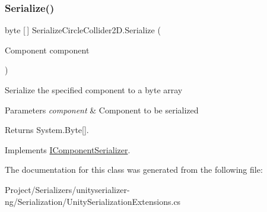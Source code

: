 \subsubsection{\texorpdfstring{Serialize()}{Serialize()}}
{\footnotesize\ttfamily byte \mbox{[}$\,$\mbox{]} Serialize\+Circle\+Collider2\+D.\+Serialize (\begin{DoxyParamCaption}\item[{Component}]{component }\end{DoxyParamCaption})\hspace{0.3cm}{\ttfamily [inline]}}



Serialize the specified component to a byte array 


\begin{DoxyParams}{Parameters}
{\em component} & Component to be serialized\\
\hline
\end{DoxyParams}
\begin{DoxyReturn}{Returns}
System.\+Byte\mbox{[}\mbox{]}.
\end{DoxyReturn}


Implements \hyperlink{interface_i_component_serializer_ab2aa38005665496b62d6c54b5f0dbd31}{I\+Component\+Serializer}.



The documentation for this class was generated from the following file\+:\begin{DoxyCompactItemize}
\item 
Project/\+Serializers/unityserializer-\/ng/\+Serialization/Unity\+Serialization\+Extensions.\+cs\end{DoxyCompactItemize}
